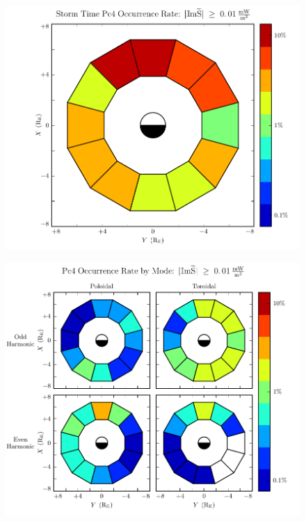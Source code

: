 \begin{figure}[!htb]
    \centering
    \includegraphics[width=\textwidth]{figures/rate_storm.pdf}
    \caption[Pc4 Rate: Dst $< \SI{-30}{\nT}$]{
      \todo{$\cdots$}
    }
    \label{fig_rate_storm}
\end{figure}






\begin{figure}[!htb]
    \centering
    \includegraphics[width=\textwidth]{figures/mode_all.pdf}
    \caption[Pc4 Rate by Mode]{
      \todo{$\cdots$}
    }
    \label{fig_mode_all}
\end{figure}

